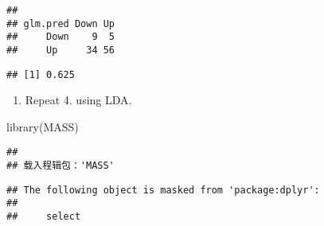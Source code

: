 \documentclass[
]{article}
\newenvironment{Shaded}{\begin{snugshade}}{\end{snugshade}}
\newcommand{\AttributeTok}[1]{\textcolor[rgb]{0.77,0.63,0.00}{#1}}
\newcommand{\DecValTok}[1]{\textcolor[rgb]{0.00,0.00,0.81}{#1}}
\newcommand{\FloatTok}[1]{\textcolor[rgb]{0.00,0.00,0.81}{#1}}
\newcommand{\FunctionTok}[1]{\textcolor[rgb]{0.00,0.00,0.00}{#1}}
\newcommand{\NormalTok}[1]{#1}
\newcommand{\OtherTok}[1]{\textcolor[rgb]{0.56,0.35,0.01}{#1}}
\newcommand{\SpecialCharTok}[1]{\textcolor[rgb]{0.00,0.00,0.00}{#1}}
\newcommand{\StringTok}[1]{\textcolor[rgb]{0.31,0.60,0.02}{#1}}
\providecommand{\tightlist}{%
  \setlength{\itemsep}{0pt}\setlength{\parskip}{0pt}}
\begin{document}
\begin{Shaded}
\end{Shaded}

\begin{verbatim}
##         
## glm.pred Down Up
##     Down    9  5
##     Up     34 56
\end{verbatim}

\begin{Shaded}
\end{Shaded}

\begin{verbatim}
## [1] 0.625
\end{verbatim}

\begin{enumerate}
\def\labelenumi{\arabic{enumi}.}
\setcounter{enumi}{4}
\tightlist
\item
  Repeat 4. using LDA.
\end{enumerate}

\begin{Shaded}
\begin{Highlighting}[]
\FunctionTok{library}\NormalTok{(MASS)}
\end{Highlighting}
\end{Shaded}

\begin{verbatim}
## 
## 载入程辑包：'MASS'
\end{verbatim}

\begin{verbatim}
## The following object is masked from 'package:dplyr':
## 
##     select
\end{verbatim}
\end{document}
